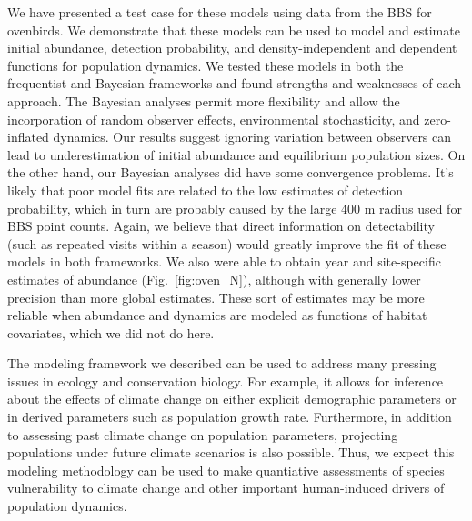 \documentclass[12pt]{article}
\begin{document}
We have presented a test case for these models using data from
the BBS for ovenbirds. We demonstrate that these models can be
used to model and estimate initial abundance, detection
probability, and density-independent and dependent functions for
population dynamics. We tested these models in both the
frequentist and Bayesian frameworks and found strengths and
weaknesses of each approach. The Bayesian analyses permit more
flexibility and allow the incorporation of random observer
effects, environmental stochasticity, and zero-inflated dynamics. 
Our results suggest ignoring
variation between observers can lead to underestimation of
initial abundance and equilibrium population sizes. On the other
hand, our Bayesian analyses did have some convergence problems.
It's likely that poor model fits are related to the low estimates of
detection probability, which in turn are probably caused by the
large 400 m radius used for BBS point counts. Again, we believe
that direct information on detectability (such as repeated
visits within a season) would greatly improve the fit of these
models in both frameworks.  We also were able to obtain year
and site-specific estimates of abundance (Fig.~\ref{fig:oven_N}),
although with generally lower precision than more global estimates.  These sort of estimates
may be more reliable when abundance and dynamics are modeled 
as functions of habitat covariates, which we did not do here.

The modeling framework we described can be used to address many
pressing issues in ecology and conservation biology. For
example,
it allows for inference %
about the effects of climate change on either explicit
demographic parameters or in derived parameters such as
population growth rate. Furthermore, %
in addition to assessing past climate change on population
parameters, projecting populations under future climate scenarios is also
possible. Thus, we expect this modeling methodology can be used
to make quantiative assessments of species vulnerability to climate
change and other important human-induced drivers of population
dynamics.
\end{document}
